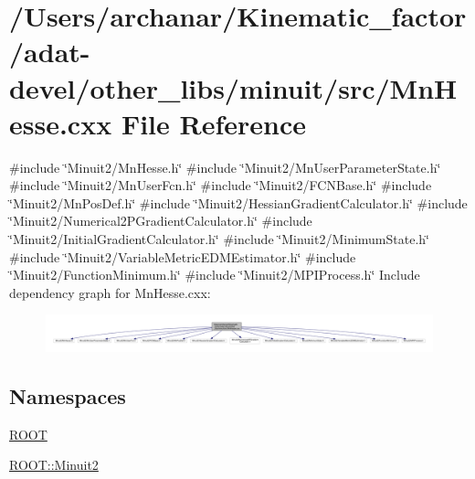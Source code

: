 \hypertarget{adat-devel_2other__libs_2minuit_2src_2MnHesse_8cxx}{}\section{/\+Users/archanar/\+Kinematic\+\_\+factor/adat-\/devel/other\+\_\+libs/minuit/src/\+Mn\+Hesse.cxx File Reference}
\label{adat-devel_2other__libs_2minuit_2src_2MnHesse_8cxx}
{\ttfamily \#include \char`\"{}Minuit2/\+Mn\+Hesse.\+h\char`\"{}}\newline
{\ttfamily \#include \char`\"{}Minuit2/\+Mn\+User\+Parameter\+State.\+h\char`\"{}}\newline
{\ttfamily \#include \char`\"{}Minuit2/\+Mn\+User\+Fcn.\+h\char`\"{}}\newline
{\ttfamily \#include \char`\"{}Minuit2/\+F\+C\+N\+Base.\+h\char`\"{}}\newline
{\ttfamily \#include \char`\"{}Minuit2/\+Mn\+Pos\+Def.\+h\char`\"{}}\newline
{\ttfamily \#include \char`\"{}Minuit2/\+Hessian\+Gradient\+Calculator.\+h\char`\"{}}\newline
{\ttfamily \#include \char`\"{}Minuit2/\+Numerical2\+P\+Gradient\+Calculator.\+h\char`\"{}}\newline
{\ttfamily \#include \char`\"{}Minuit2/\+Initial\+Gradient\+Calculator.\+h\char`\"{}}\newline
{\ttfamily \#include \char`\"{}Minuit2/\+Minimum\+State.\+h\char`\"{}}\newline
{\ttfamily \#include \char`\"{}Minuit2/\+Variable\+Metric\+E\+D\+M\+Estimator.\+h\char`\"{}}\newline
{\ttfamily \#include \char`\"{}Minuit2/\+Function\+Minimum.\+h\char`\"{}}\newline
{\ttfamily \#include \char`\"{}Minuit2/\+M\+P\+I\+Process.\+h\char`\"{}}\newline
Include dependency graph for Mn\+Hesse.\+cxx\+:
\nopagebreak
\begin{figure}[H]
\begin{center}
\leavevmode
\includegraphics[width=350pt]{de/d37/adat-devel_2other__libs_2minuit_2src_2MnHesse_8cxx__incl}
\end{center}
\end{figure}
\subsection*{Namespaces}
\begin{DoxyCompactItemize}
\item 
 \mbox{\hyperlink{namespaceROOT}{R\+O\+OT}}
\item 
 \mbox{\hyperlink{namespaceROOT_1_1Minuit2}{R\+O\+O\+T\+::\+Minuit2}}
\end{DoxyCompactItemize}
